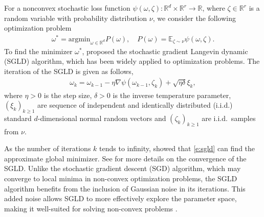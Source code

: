 \documentclass[12pt]{amsart}
\theoremstyle{definition}
\theoremstyle{remark}
\numberwithin{equation}{section}
\newcommand{\E}{\mathbb{E}}            %
\newcommand{\R}{\mathbb{R}}\newcommand{\RR}{\mathbb{R}}
\newcommand{\red}{\color{red}}
\begin{document}
For a nonconvex stochastic loss function $\psi(\omega,\zeta): \R^d\times\R^r\to\R$, where $\zeta\in\R^r$ is a random variable with probability distribution $\nu$, we consider the following optimization problem
\begin{eqnarray*}
	\omega^*=\text{argmin}_{\omega\in\R^d}P(\omega),\quad P(\omega)=\E_{\zeta\sim\nu}\psi(\omega,\zeta).
\end{eqnarray*}
To find the minimizer $\omega^*$, \cite{welling2011bayesian} proposed the stochastic gradient Langevin dynamic (SGLD) algorithm, which has been widely applied to optimization problems. The iteration of the SGLD is given as follows,
\begin{eqnarray}\label{e:sgld}
	\omega_k=\omega_{k-1}-\eta\nabla\psi(\omega_{k-1},\zeta_k)+\sqrt{\eta\delta}\xi_{k},
\end{eqnarray}	
where $\eta>0$ is the step size, $\delta>0$ is the inverse temperature parameter, $(\xi_k)_{k\ge1}$ are sequence of independent and identically distributed (i.i.d.) standard $d$-dimensional normal random vectors and $(\zeta_k)_{k\ge1}$ are i.i.d.\ samples from $\nu$. 


As the number of iterations $k$ tends to infinity, \cite{raginsky2017non} showed that \eqref{e:sgld} can find the approximate global minimizer. See \cite{xu2018global, lamperski2021projected, chen2020stationary} for more details on the convergence of the SGLD. Unlike the stochastic gradient descent (SGD) algorithm, which may converge to local minima in non-convex optimization problems, the SGLD algorithm benefits from the inclusion of Gaussian noise in its iterations. This added noise allows SGLD to more effectively explore the parameter space, making it well-suited for solving non-convex problems
\cite{chen2020stationary, zhang2017hitting}. 


\end{document}
